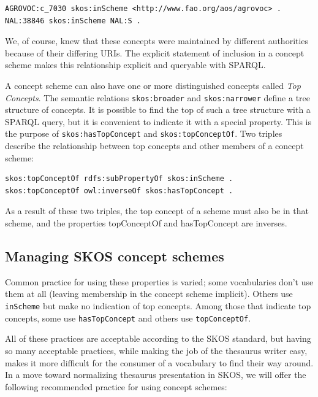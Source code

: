\begin{lstlisting}
AGROVOC:c_7030 skos:inScheme <http://www.fao.org/aos/agrovoc> .
NAL:38846 skos:inScheme NAL:S .
\end{lstlisting}

We, of course, knew that these concepts were maintained by different
authorities because of their differing URIs. The explicit statement of
inclusion in a concept scheme makes this relationship explicit and
queryable with SPARQL.

A concept scheme can also have one or more distinguished concepts called
\emph{Top Concepts}. The semantic relations \texttt{skos:broader} and \texttt{skos:narrower}
define a tree structure of concepts. It is possible to find the top of
such a tree structure with a SPARQL query, but it is convenient to
indicate it with a special property. This is the purpose of
\texttt{skos:hasTopConcept} and \texttt{skos:topConceptOf}. Two triples describe the
relationship between top concepts and other members of a concept scheme:

\begin{lstlisting}
skos:topConceptOf rdfs:subPropertyOf skos:inScheme .
skos:topConceptOf owl:inverseOf skos:hasTopConcept .
\end{lstlisting}

As a result of these two triples, the top concept of a scheme must also
be in that scheme, and the properties topConceptOf and hasTopConcept are
inverses.

\subsection{Managing SKOS concept schemes}

Common practice for using these properties is varied; some vocabularies
don't use them at all (leaving membership in the concept scheme
implicit). Others use \texttt{inScheme} but make no indication of top concepts.
Among those that indicate top concepts, some use \texttt{hasTopConcept} and
others use \texttt{topConceptOf}.

All of these practices are acceptable according to the SKOS standard,
but having so many
acceptable practices, while making the job of the thesaurus writer easy,
makes it more difficult for the consumer of a vocabulary to find their way around. 
In a move toward normalizing thesaurus presentation in
SKOS, we will offer the following recommended practice for using concept
schemes:

